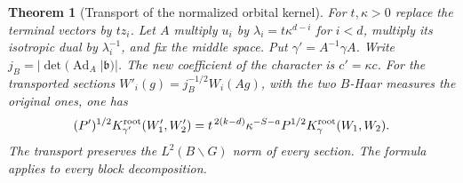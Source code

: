 \documentclass[a4paper,11pt]{article}
\newtheorem{theorem}[proposition]{Theorem}
\theoremstyle{definition}
\theoremstyle{remark}
\numberwithin{equation}{section}
\begin{document}
\begin{theorem}[Transport of the normalized orbital kernel]
\label{thm:scale207}
For \(t,\kappa>0\) replace the terminal vectors by \(t z_i\).
Let \(A\) multiply \(u_i\) by \(\lambda_i=t\kappa^{d-i}\)
for \(i<d\), multiply its isotropic dual by \(\lambda_i^{-1}\),
and fix the middle space. Put \(\gamma'=A^{-1}\gamma A\).
Write \(j_B=|\det(\operatorname{Ad}_A|\mathfrak b)|\).
The new coefficient of the character is \(c'=\kappa c\).
For the transported sections \(W'_i(g)=j_B^{-1/2}W_i(Ag)\),
with the two \(B\)-Haar measures the original ones, one has
\begin{equation}
  (P')^{1/2}K_{\gamma'}^{\rm root}(W'_1,W'_2)
     =t^{\,2(k-d)}\kappa^{-S-a}
                         P^{1/2}K_{\gamma}^{\rm root}(W_1,W_2).
                                                        \label{eq:scale207}
\end{equation}
The transport preserves the \(L^2(B\backslash G)\) norm of every
section. The formula applies to every block decomposition.
\end{theorem}
\end{document}
